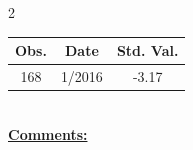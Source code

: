 
\bigskip 
\begin{multicols}{2}{ 
\begin{tabular}{ccc}
\hline  Obs.  &  Date &  Std. Val. \\ 
\hline 
                      168 &        1/2016 &         -3.17 \vspace{-.12in} \\  
 \end{tabular} 
\\ 
 \columnbreak 
 \singlespacing 
 \underline{\textbf{Comments:}} \\ 
 \bigskip       

 } 
\end{multicols} 
